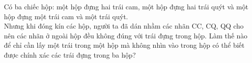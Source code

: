 \begin{bt}
	Có ba chiếc hộp: một hộp đựng hai trái cam, một hộp đựng hai trái quýt và một hộp đựng một trái cam và một trái quýt.\\
	Nhưng khi đóng kín các hộp, người ta đã dán nhầm các nhãn CC, CQ, QQ cho nên các nhãn ở ngoài hộp đều không đúng với trái đựng trong hộp. Làm thế nào để chỉ cần lấy một trái trong một hộp mà không nhìn vào trong hộp có thể biết được chính xác các trái đựng trong ba hộp?
\end{bt}















